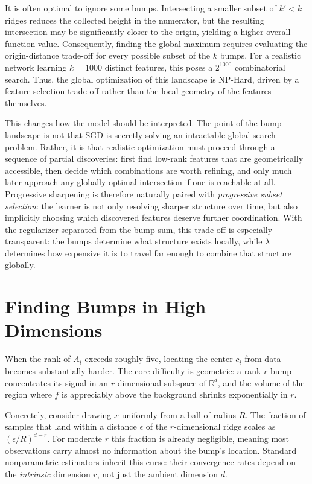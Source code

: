 \documentclass{article}
\begin{document}
It is often optimal to ignore some bumps. Intersecting a smaller subset of $k' < k$ ridges reduces the collected height in the numerator, but the resulting intersection may be significantly closer to the origin, yielding a higher overall function value. Consequently, finding the global maximum requires evaluating the origin-distance trade-off for every possible subset of the $k$ bumps. For a realistic network learning $k=1000$ distinct features, this poses a $2^{1000}$ combinatorial search. Thus, the global optimization of this landscape is NP-Hard, driven by a feature-selection trade-off rather than the local geometry of the features themselves.

This changes how the model should be interpreted. The point of the bump
landscape is not that SGD is secretly solving an intractable global
search problem. Rather, it is that realistic optimization must proceed
through a sequence of partial discoveries: first find low-rank features
that are geometrically accessible, then decide which combinations are
worth refining, and only much later approach any globally optimal
intersection if one is reachable at all. Progressive sharpening is
therefore naturally paired with \emph{progressive subset selection}: the
learner is not only resolving sharper structure over time, but also
implicitly choosing which discovered features deserve further
coordination. With the regularizer separated from the bump sum, this
trade-off is especially transparent: the bumps determine what structure
exists locally, while $\lambda$ determines how expensive it is to travel
far enough to combine that structure globally.

\section{Finding Bumps in High Dimensions}

When the rank of $A_i$ exceeds roughly five, locating the center $c_i$
from data becomes substantially harder. The core difficulty is geometric:
a rank-$r$ bump concentrates its signal in an $r$-dimensional subspace of
$\mathbb{R}^d$, and the volume of the region where $f$ is appreciably
above the background shrinks exponentially in $r$.

Concretely, consider drawing $x$ uniformly from a ball of radius $R$.
The fraction of samples that land within a distance $\epsilon$ of the
$r$-dimensional ridge scales as $(\epsilon/R)^{d-r}$. For moderate $r$
this fraction is already negligible, meaning most observations carry
almost no information about the bump's location. Standard nonparametric
estimators inherit this curse: their convergence rates depend on the
\emph{intrinsic} dimension $r$, not just the ambient dimension $d$.
\end{document}
